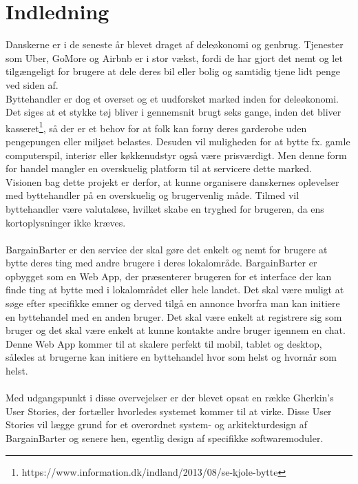 \chapter{Indledning}
Danskerne er i de seneste år blevet draget af deleøkonomi og genbrug. Tjenester som Uber, GoMore og Airbnb er i stor vækst, fordi de har gjort det nemt og let tilgængeligt for brugere at dele deres bil eller bolig og samtidig tjene lidt penge ved siden af. \\
Byttehandler er dog et overset og et uudforsket marked inden for deleøkonomi. Det siges at et stykke tøj bliver i gennemsnit brugt seks gange, inden det bliver kasseret\footnote{https://www.information.dk/indland/2013/08/se-kjole-bytte}, så der er et behov for at folk kan forny deres garderobe uden pengepungen eller miljøet belastes. Desuden vil muligheden for at bytte fx. gamle computerspil, interiør eller køkkenudstyr også være prisværdigt. Men denne form for handel mangler en overskuelig platform til at servicere dette marked. \\ 
Visionen bag dette projekt er derfor, at kunne organisere danskernes oplevelser med byttehandler på en overskuelig og brugervenlig måde. Tilmed vil byttehandler være valutaløse, hvilket skabe en tryghed for brugeren, da ens kortoplysninger ikke kræves.  \\ \\
BargainBarter er den service der skal gøre det enkelt og nemt for brugere at bytte deres ting med andre brugere i deres lokalområde. BargainBarter er opbygget som en Web App, der præsenterer brugeren for et interface der kan finde ting at bytte med i lokalområdet eller hele landet. Det skal være muligt at søge efter specifikke emner og derved tilgå en annonce hvorfra man kan initiere en byttehandel med en anden bruger. Det skal være enkelt at registrere sig som bruger og det skal være enkelt at kunne kontakte andre bruger igennem en chat. Denne Web App kommer til at skalere perfekt til mobil, tablet og desktop, således at brugerne kan initiere en byttehandel hvor som helst og hvornår som helst.  \\ \\
Med udgangspunkt i disse overvejelser er der blevet opsat en række Gherkin's User Stories, der fortæller hvorledes systemet kommer til at virke. Disse User Stories vil lægge grund for et overordnet system- og arkitekturdesign af BargainBarter og senere hen, egentlig design af specifikke softwaremoduler.   